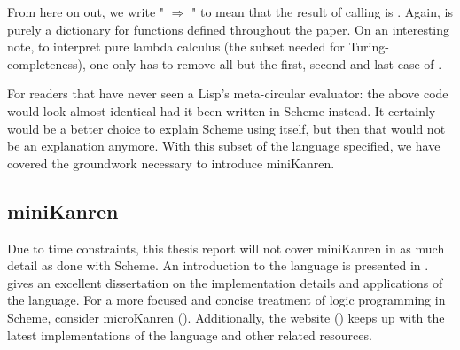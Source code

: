 From here on out, we write " $\Rightarrow$ " to mean that the result of calling  is . Again,  is purely a dictionary for functions defined throughout the paper. On an interesting note, to interpret pure lambda calculus (the subset needed for Turing-completeness), one only has to remove all but the first, second and last case of .

For readers that have never seen a Lisp's meta-circular evaluator: the above code would look almost identical had it been written in Scheme instead. It certainly would be a better choice to explain Scheme using itself, but then that would not be an explanation anymore. With this subset of the language specified, we have covered the groundwork necessary to introduce miniKanren.
\subsection{miniKanren}
Due to time constraints, this \ifthesis thesis \else report \fi will not cover miniKanren in as much detail as done with Scheme.
An introduction to the language is presented in \cite{reasoned}.
\textcite{byrdphd} gives an excellent dissertation on the implementation details and applications of the language.
For a more focused and concise treatment of logic programming in Scheme, consider microKanren (\cite{micro}).
Additionally, the website (\cite{mkdotorg}) keeps up with the latest implementations of the language and other related resources.

